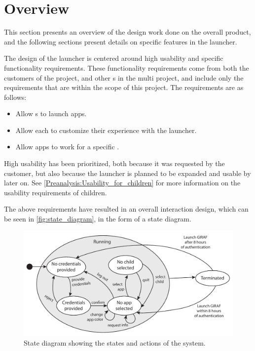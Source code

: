 \chapter{Overview}
\label{sec:design_overview}
This section presents an overview of the design work done on the overall product, and the following sections present details on specific features in the launcher. \newline

The design of the \giraf[] launcher is centered around high usability and specific functionality requirements. 
These functionality requirements come from both the customers of the project, and other \localgroup[]s in the multi project, and include only the requirements that are within the scope of this project. \newline
The requirements are as follows:
\begin{itemize}
\item Allow \guardian[]s to launch apps.
\item Allow each \guardian[] to customize their experience with the launcher. 
\item Allow apps to work for a specific \autist[].
\end{itemize}

High usability has been prioritized, both because it was requested by the customer, but also because the launcher is planned to be expanded and usable by \autists[] later on.
See \autoref{Preanalysis:Usability_for_children} for more information on the usability requirements of children. \newline

The above requirements have resulted in an overall interaction design, which can be seen in \autoref{fig:state_diagram}, in the form of a state diagram.

\begin{figure}[h]
	\centering
	\includegraphics[width=1\textwidth]{gfx/statediagram.pdf}
	\caption{State diagram showing the states and actions of the system.}
	\label{fig:state_diagram}
\end{figure}

